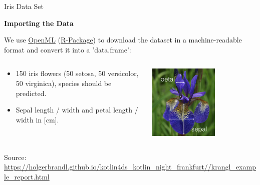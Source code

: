 \documentclass[11pt,compress,t,notes=noshow, xcolor=table]{beamer}
\begin{document}
\begin{vbframe}{Iris Data Set}
\framebreak

\textbf{Importing the Data}

We use \href{https://www.openml.org}{OpenML} (\href{https://cran.r-project.org/package=OpenML}{R-Package}) to download the dataset in a machine-readable format and convert it into a 'data.frame':


\begin{columns}
  \begin{column}{0.5\textwidth}
    \begin{itemize}
      \item 150 iris flowers (50 setosa, 50 versicolor, 50 virginica),
        species should be predicted.
      \item Sepal length / width and petal length / width in [cm].
    \end{itemize}
  \end{column}
  \begin{column}{0.5\textwidth}
    \begin{center}
      \includegraphics[width=0.6\textwidth]{figure_man/iris_petal_sepal.png}
    \end{center}
  \end{column}
\end{columns}

\vfill

\footnotesize
Source: \url{https://holgerbrandl.github.io/kotlin4ds_kotlin_night_frankfurt//krangl_example_report.html}
\normalsize

\framebreak


\end{vbframe}
\end{document}
